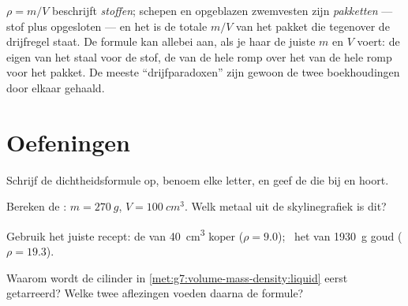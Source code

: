 \begin{remark}\label{rem:g7:volume-mass-density:parcel}
$\rho = m/V$ beschrijft \emph{stoffen}; schepen en opgeblazen
zwemvesten zijn \emph{pakketten} --- stof plus opgesloten
 --- en het is de totale $m/V$ van het pakket die tegenover de
drijfregel staat. De formule kan allebei aan, als je haar de juiste
$m$ en $V$ voert: de eigen  van het staal voor de stof, de
 van de hele romp over het  van de hele romp voor het
pakket. De meeste ``drijfparadoxen'' zijn gewoon de twee
boekhoudingen door elkaar gehaald.
\end{remark}

\section{Oefeningen}

\begin{exercise}[$\star$]\label{exo:g7:volume-mass-density:1}
Schrijf de dichtheidsformule op, benoem elke letter, en geef de
 die bij  en  hoort.
\end{exercise}

\begin{exercise}[$\star$]\label{exo:g7:volume-mass-density:2}
Bereken de : $m = \qty{270}{g}$, $V = \qty{100}{cm^3}$.
Welk metaal uit de skylinegrafiek is dit?
\end{exercise}

\begin{exercise}[$\star$]\label{exo:g7:volume-mass-density:3}
Gebruik het juiste recept: de  van \qty{40}{cm^3} koper
($\rho = 9.0$); \ het  van \qty{1930}{g} goud
($\rho = 19.3$).
\end{exercise}

\begin{exercise}[$\star$]\label{exo:g7:volume-mass-density:4}
Waarom wordt de cilinder in \cref{met:g7:volume-mass-density:liquid}
eerst getarreerd? Welke twee aflezingen voeden daarna de formule?
\end{exercise}

